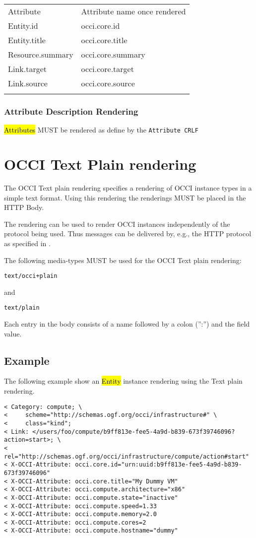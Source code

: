 \documentclass[10pt,a4paper]{article}
\begin{document}
 {
	\begin{tabular}{ll}
		\toprule
			Attribute & Attribute name once rendered \\
		\colrule
			Entity.id & occi.core.id \\
			Entity.title & occi.core.title \\
			Resource.summary & occi.core.summary \\
			Link.target & occi.core.target \\
			Link.source & occi.core.source \\
		\botrule
	\end{tabular}
}

\subsubsection{Attribute Description Rendering}
\label{sec:format_attribute_description}

\hl{Attributes} MUST be rendered as define by the {\tt Attribute CRLF}

\section{OCCI Text Plain rendering}
\label{sec:text}
The OCCI Text plain rendering specifies a rendering of OCCI instance types in a simple text format. Using this rendering the renderings MUST be placed in the HTTP Body.

The rendering can be used to render OCCI instances independently of the
protocol being used. Thus messages can be delivered by, e.g., the HTTP
protocol as specified in \cite{occi:protocol}.

The following media-types MUST be used for the OCCI Text plain rendering:

	{\tt text/occi+plain}

and

	{\tt text/plain}

Each entry in the body consists of a name followed by a colon (”:”) and the field value.

\subsection{Example}

The following example show an \hl{Entity} instance rendering using the Text plain rendering.

\begin{verbatim}
< Category: compute; \
<     scheme="http://schemas.ogf.org/occi/infrastructure#" \
<     class="kind";
< Link: </users/foo/compute/b9ff813e-fee5-4a9d-b839-673f39746096?action=start>; \
<     rel="http://schemas.ogf.org/occi/infrastructure/compute/action#start"
< X-OCCI-Attribute: occi.core.id="urn:uuid:b9ff813e-fee5-4a9d-b839-673f39746096"
< X-OCCI-Attribute: occi.core.title="My Dummy VM"
< X-OCCI-Attribute: occi.compute.architecture="x86"
< X-OCCI-Attribute: occi.compute.state="inactive"
< X-OCCI-Attribute: occi.compute.speed=1.33
< X-OCCI-Attribute: occi.compute.memory=2.0
< X-OCCI-Attribute: occi.compute.cores=2
< X-OCCI-Attribute: occi.compute.hostname="dummy"
\end{verbatim}
\end{document}
